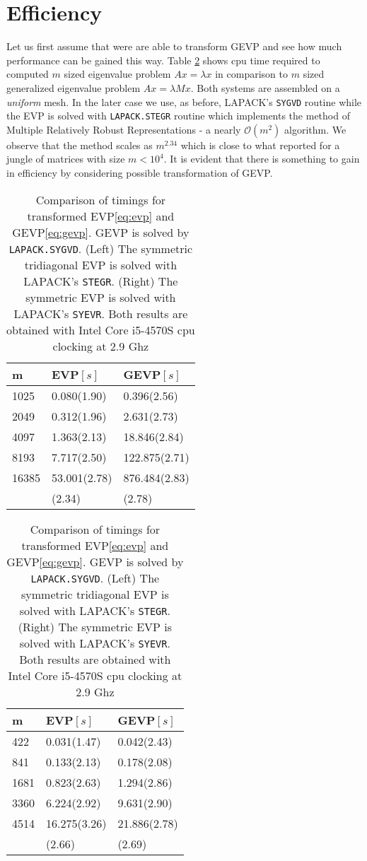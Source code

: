 \documentclass[10pt, a4paper]{article}
\begin{document}
\section*{Efficiency}Let us first assume that were are able to
transform GEVP and see how much performance can be gained this way. Table
\ref{tab:evp} shows cpu time required to computed $m$ sized eigenvalue problem
$Ax=\lambda x$ in comparison to $m$ sized generalized eigenvalue problem
$Ax=\lambda M x$. Both systems are assembled on a \textit{uniform} mesh. In the
later case we use, as before, LAPACK's \texttt{SYGVD} routine while the EVP is
solved with \texttt{LAPACK.STEGR} routine which implements the method of
Multiple Relatively Robust Representations \cite{mmmr} - a nearly
$\mathcal{O}(m^2)$ algorithm. We observe that the method scales as $m^{2.34}$
which is close to what \cite{demmel} reported for a jungle of matrices with size
$m<10^4$. It is evident that there is something to gain in efficiency by considering
possible transformation of GEVP.
%
%
\begin{table}
\caption{Comparison of timings for transformed EVP\eqref{eq:evp} and 
  GEVP\eqref{eq:gevp}. GEVP is solved by \texttt{LAPACK.SYGVD}. (Left) The
  symmetric tridiagonal EVP is solved with LAPACK's \texttt{STEGR}. (Right)
  The symmetric EVP is solved with LAPACK's \texttt{SYEVR}. Both results 
  are obtained with Intel Core i5-4570S cpu clocking at 2.9 Ghz}
\label{tab:evp}
\begin{subtable}{0.48\textwidth}
  \centering
  \footnotesize{
  \begin{tabular}{l|ll}
  \hline
    m & EVP$\left[s\right]$ & GEVP$\left[s\right]$\\
  \hline
  1025 & 0.080(1.90) & 0.396(2.56)\\
  2049 & 0.312(1.96) & 2.631(2.73)\\
  4097 & 1.363(2.13) & 18.846(2.84)\\
  8193 & 7.717(2.50) & 122.875(2.71)\\
  16385 & 53.001(2.78) & 876.484(2.83)\\
  \hline
      & (2.34) & (2.78)\\
  \hline
  \end{tabular}
  }
\end{subtable}
%
\begin{subtable}{0.48\textwidth}
  \centering
  \footnotesize{
  \begin{tabular}{l|ll}
  \hline
    m & EVP$\left[s\right]$ & GEVP$\left[s\right]$\\
  \hline
  422 & 0.031(1.47) & 0.042(2.43)\\
  841 & 0.133(2.13) & 0.178(2.08)\\
  1681 & 0.823(2.63) & 1.294(2.86)\\
  3360 & 6.224(2.92) & 9.631(2.90)\\
  4514 & 16.275(3.26) & 21.886(2.78)\\
  \hline
    & (2.66) & (2.69)\\
  \hline
  \end{tabular}
  }
\end{subtable}
\end{table}
\end{document}
